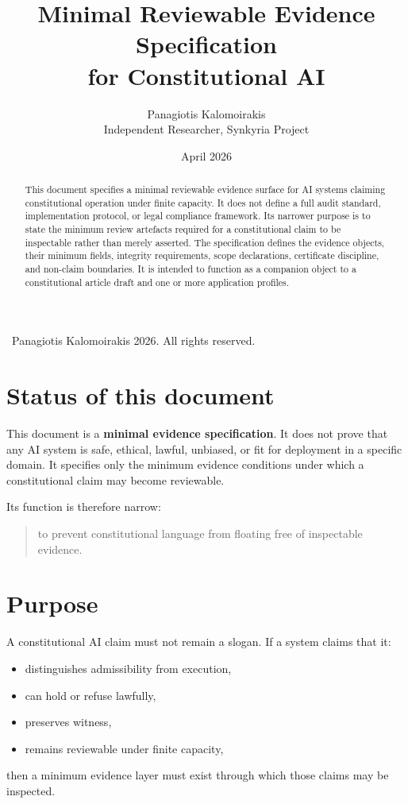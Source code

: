\documentclass[11pt]{article}
\title{Minimal Reviewable Evidence Specification\\
for Constitutional AI}
\author{Panagiotis Kalomoirakis\\
Independent Researcher, Synkyria Project}
\date{April 2026}
\begin{document}
\maketitle

\begin{center}
\small \textcopyright\ Panagiotis Kalomoirakis 2026. All rights reserved.
\end{center}

\begin{abstract}
This document specifies a minimal reviewable evidence surface for AI systems claiming constitutional operation under finite capacity. It does not define a full audit standard, implementation protocol, or legal compliance framework. Its narrower purpose is to state the minimum review artefacts required for a constitutional claim to be inspectable rather than merely asserted. The specification defines the evidence objects, their minimum fields, integrity requirements, scope declarations, certificate discipline, and non-claim boundaries. It is intended to function as a companion object to a constitutional article draft and one or more application profiles.
\end{abstract}

\section{Status of this document}

This document is a \textbf{minimal evidence specification}. It does not prove that any AI system is safe, ethical, lawful, unbiased, or fit for deployment in a specific domain. It specifies only the minimum evidence conditions under which a constitutional claim may become reviewable.

Its function is therefore narrow:

\begin{quote}
to prevent constitutional language from floating free of inspectable evidence.
\end{quote}

\section{Purpose}

A constitutional AI claim must not remain a slogan. If a system claims that it:
\begin{itemize}[leftmargin=2em]
    \item distinguishes admissibility from execution,
    \item can hold or refuse lawfully,
    \item preserves witness,
    \item remains reviewable under finite capacity,
\end{itemize}
then a minimum evidence layer must exist through which those claims may be inspected.
\end{document}
